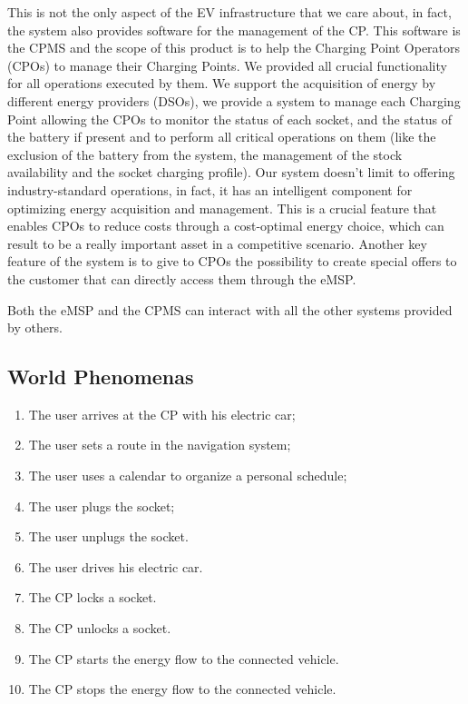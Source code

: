 \documentclass{Configuration_Files/PoliMi3i_thesis}
\begin{document}
This is not the only aspect of the EV infrastructure that we care about, in fact, the system also provides software for the management of the CP. This software is the CPMS and the scope of this product is to help the Charging Point Operators (CPOs) to manage their Charging Points. We provided all crucial functionality for all operations executed by them. We support the acquisition of energy by different energy providers (DSOs), we provide a system to manage each Charging Point allowing the CPOs to monitor the status of each socket, and the status of the battery if present and to perform all critical operations on them (like the exclusion of the battery from the system, the management of the stock availability and the socket charging profile). 
Our system doesn't limit to offering industry-standard operations, in fact, it has an intelligent component for optimizing energy acquisition and management. This is a crucial feature that enables CPOs to reduce costs through a cost-optimal energy choice, which can result to be a really important asset in a competitive scenario. 
Another key feature of the system is to give to CPOs the possibility to create special offers to the customer that can directly access them through the eMSP. 

Both the eMSP and the CPMS can interact with all the other systems provided by others.
\subsection{World Phenomenas}

\begin{enumerate}[label=\textbf{WP\arabic*}]
    \item The user arrives at the CP with his electric car;
    \item The user sets a route in the navigation system;
    \item The user uses a calendar to organize a personal schedule;
    \item The user plugs the socket;
    \item The user unplugs the socket.
    \item The user drives his electric car.
    \item The CP locks a socket.
    \item The CP unlocks a socket.
    \item The CP starts the energy flow to the connected vehicle.
    \item The CP stops the energy flow to the connected vehicle.
\end{enumerate}
\end{document}
